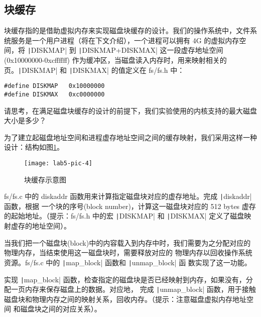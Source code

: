 \subsection{块缓存}

块缓存指的是借助虚拟内存来实现磁盘块缓存的设计。我们的操作系统中，文件系统服务是一个用户进程（将在下文介绍），一个进程可以拥有 4G 
的虚拟内存空间，将 \texttt|DISKMAP| 到 \texttt|DISKMAP+DISKMAX| 这一段虚存地址空间
(0x10000000-0xcffffff) 作为缓冲区，当磁盘读入内存时，用来映射相关的页。\texttt|DISKMAP| 和
\texttt|DISKMAX| 的值定义在 fs/fs.h 中：

\begin{verbatim}
#define DISKMAP   0x10000000
#define DISKMAX   0xc0000000
\end{verbatim}

\begin{thinking}\label{think-disksize}
请思考，在满足磁盘块缓存的设计的前提下，我们实验使用的内核支持的最大磁盘大小是多少？
\end{thinking}

为了建立起磁盘地址空间和进程虚存地址空间之间的缓存映射，我们采用这样一种设计：结构如图\ref{lab5-pic-4}。

\begin{figure}[htbp]
  \centering
  \texttt{[image: lab5-pic-4]}
  \caption{块缓存示意图}\label{lab5-pic-4}
\end{figure}

\begin{exercise}
fs/fs.c 中的 diskaddr 函数用来计算指定磁盘块对应的虚存地址。完成 \texttt|diskaddr| 函数，根据
一个块的序号(block number)，计算这一磁盘块对应的 512 bytes 虚存的起始地址。（提示：fs/fs.h 中的宏
\texttt|DISKMAP| 和 \texttt|DISKMAX| 定义了磁盘映射虚存的地址空间）。
\end{exercise}

当我们把一个磁盘块(block)中的内容载入到内存中时，我们需要为之分配对应的物理内存，当结束使用这一磁盘块时，需要释放对应的
物理内存以回收操作系统资源。fs/fs.c 中的 \texttt|map_block| 函数和 \texttt|unmap_block| 函
数实现了这一功能。

\begin{exercise}
实现 \texttt|map_block| 函数，检查指定的磁盘块是否已经映射到内存，如果没有，分配一页内存来保存磁盘上的数据。对应地，
完成 \texttt|unmap_block| 函数，用于接触磁盘块和物理内存之间的映射关系，回收内存。（提示：注意磁盘虚拟内存地址空间
和磁盘块之间的对应关系）。
\end{exercise}

